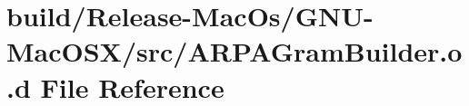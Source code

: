 \hypertarget{_release-_mac_os_2_g_n_u-_mac_o_s_x_2src_2_a_r_p_a_gram_builder_8o_8d}{}\section{build/\+Release-\/\+Mac\+Os/\+G\+N\+U-\/\+Mac\+O\+S\+X/src/\+A\+R\+P\+A\+Gram\+Builder.o.\+d File Reference}
\label{_release-_mac_os_2_g_n_u-_mac_o_s_x_2src_2_a_r_p_a_gram_builder_8o_8d}
